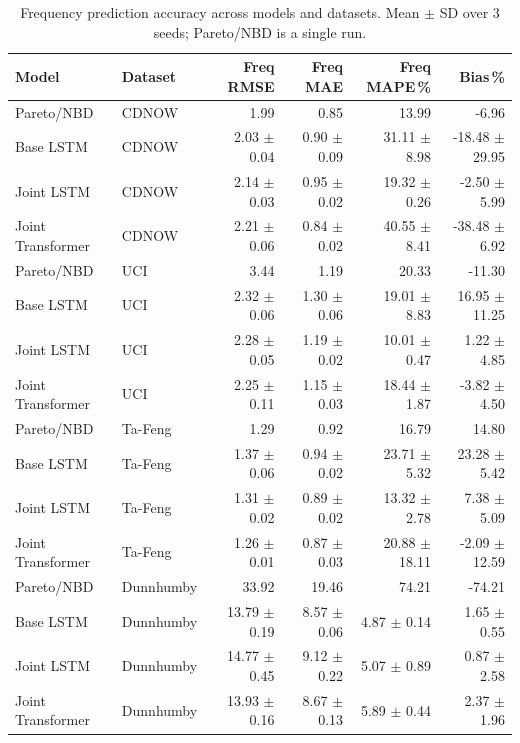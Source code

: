 \begin{table}[htbp]
\centering
\small
\setlength{\tabcolsep}{4pt}
\caption{Frequency prediction accuracy across models and datasets. Mean $\pm$ SD over 3 seeds; Pareto/NBD is a single run.}
\label{tab:freq_accuracy}
\begin{tabular}{llrrrr}
\toprule
Model & Dataset & Freq RMSE & Freq MAE & Freq MAPE\,\% & Bias\,\% \\
\midrule
Pareto/NBD & CDNOW & 1.99 & 0.85 & 13.99 & -6.96 \\
Base LSTM & CDNOW & 2.03 $\pm$ 0.04 & 0.90 $\pm$ 0.09 & 31.11 $\pm$ 8.98 & -18.48 $\pm$ 29.95 \\
Joint LSTM & CDNOW & 2.14 $\pm$ 0.03 & 0.95 $\pm$ 0.02 & 19.32 $\pm$ 0.26 & -2.50 $\pm$ 5.99 \\
Joint Transformer & CDNOW & 2.21 $\pm$ 0.06 & 0.84 $\pm$ 0.02 & 40.55 $\pm$ 8.41 & -38.48 $\pm$ 6.92 \\
\midrule
Pareto/NBD & UCI & 3.44 & 1.19 & 20.33 & -11.30 \\
Base LSTM & UCI & 2.32 $\pm$ 0.06 & 1.30 $\pm$ 0.06 & 19.01 $\pm$ 8.83 & 16.95 $\pm$ 11.25 \\
Joint LSTM & UCI & 2.28 $\pm$ 0.05 & 1.19 $\pm$ 0.02 & 10.01 $\pm$ 0.47 & 1.22 $\pm$ 4.85 \\
Joint Transformer & UCI & 2.25 $\pm$ 0.11 & 1.15 $\pm$ 0.03 & 18.44 $\pm$ 1.87 & -3.82 $\pm$ 4.50 \\
\midrule
Pareto/NBD & Ta-Feng & 1.29 & 0.92 & 16.79 & 14.80 \\
Base LSTM & Ta-Feng & 1.37 $\pm$ 0.06 & 0.94 $\pm$ 0.02 & 23.71 $\pm$ 5.32 & 23.28 $\pm$ 5.42 \\
Joint LSTM & Ta-Feng & 1.31 $\pm$ 0.02 & 0.89 $\pm$ 0.02 & 13.32 $\pm$ 2.78 & 7.38 $\pm$ 5.09 \\
Joint Transformer & Ta-Feng & 1.26 $\pm$ 0.01 & 0.87 $\pm$ 0.03 & 20.88 $\pm$ 18.11 & -2.09 $\pm$ 12.59 \\
\midrule
Pareto/NBD & Dunnhumby & 33.92 & 19.46 & 74.21 & -74.21 \\
Base LSTM & Dunnhumby & 13.79 $\pm$ 0.19 & 8.57 $\pm$ 0.06 & 4.87 $\pm$ 0.14 & 1.65 $\pm$ 0.55 \\
Joint LSTM & Dunnhumby & 14.77 $\pm$ 0.45 & 9.12 $\pm$ 0.22 & 5.07 $\pm$ 0.89 & 0.87 $\pm$ 2.58 \\
Joint Transformer & Dunnhumby & 13.93 $\pm$ 0.16 & 8.67 $\pm$ 0.13 & 5.89 $\pm$ 0.44 & 2.37 $\pm$ 1.96 \\
\bottomrule
\end{tabular}
\end{table}